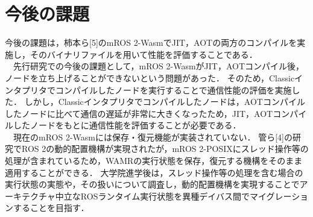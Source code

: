 \section{今後の課題}
今後の課題は，柿本ら[5]のmROS 2-WasmでJIT，AOTの両方のコンパイルを実施し，そのバイナリファイルを用いて性能を評価することである．
\\　先行研究での今後の課題として，mROS 2-WasmがJIT，AOTコンパイル後，ノードを立ち上げることができないという問題があった．
そのため，Classicインタプリタでコンパイルしたノードを実行することで通信性能の評価を実施した．
しかし，Classicインタプリタでコンパイルしたノードは，AOTコンパイルしたノードに比べて通信の遅延が非常に大きくなったため，JIT，AOTコンパイルしたノードをもとに通信性能を評価することが必要である．
\\　現在のmROS 2-Wasmには保存・復元機能が実装されていない．
管ら[4]の研究でROS 2の動的配置機構が実現されたが，mROS 2-POSIXにスレッド操作等の処理が含まれているため，WAMRの実行状態を保存，復元する機構をそのまま適用することができる．
大学院進学後は，スレッド操作等の処理を含む場合の実行状態の実態や，その扱いについて調査し，動的配置機構を実現することでアーキテクチャ中立なROSランタイム実行状態を異種デイバス間でマイグレーションすることを目指す．
